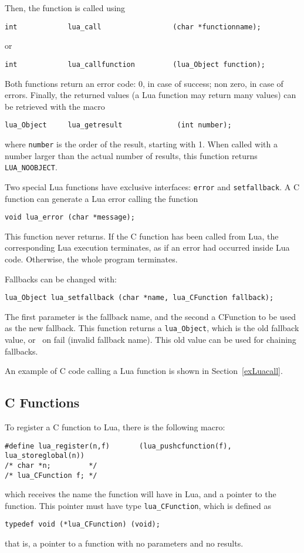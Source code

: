 Then, the function is called using
\begin{verbatim}
int            lua_call                 (char *functionname);
\end{verbatim}
or
\begin{verbatim}
int            lua_callfunction         (lua_Object function);
\end{verbatim}
Both functions return an error code:
0, in case of success; non zero, in case of errors.
Finally, the returned values (a Lua function may return many values)
can be retrieved with the macro
\begin{verbatim}
lua_Object     lua_getresult             (int number);
\end{verbatim}
where \verb'number' is the order of the result, starting with 1.
When called with a number larger than the actual number of results,
this function returns \verb'LUA_NOOBJECT'.

Two special Lua functions have exclusive interfaces:
\verb'error' and \verb'setfallback'.
A C function can generate a Lua error calling the function
\begin{verbatim}
void lua_error (char *message);
\end{verbatim}
This function never returns.
If the C function has been called from Lua,
the corresponding Lua execution terminates,
as if an error had occurred inside Lua code.
Otherwise, the whole program terminates.

Fallbacks can be changed with:
\begin{verbatim}
lua_Object lua_setfallback (char *name, lua_CFunction fallback);
\end{verbatim}
The first parameter is the fallback name,
and the second a CFunction to be used as the new fallback.
This function returns a \verb'lua_Object',
which is the old fallback value,
or \nil\ on fail (invalid fallback name).
This old value can be used for chaining fallbacks.

An example of C code calling a Lua function is shown in
Section~\ref{exLuacall}.


\subsection{C Functions} \label{LuacallC}
To register a C function to Lua,
there is the following macro:
\begin{verbatim}
#define lua_register(n,f)       (lua_pushcfunction(f), lua_storeglobal(n))
/* char *n;         */
/* lua_CFunction f; */
\end{verbatim}
which receives the name the function will have in Lua,
and a pointer to the function.
This pointer must have type \verb'lua_CFunction',
which is defined as
\begin{verbatim}
typedef void (*lua_CFunction) (void);
\end{verbatim}
that is, a pointer to a function with no parameters and no results.

